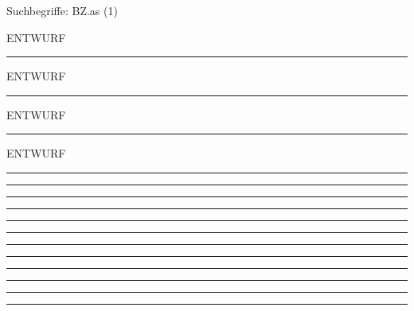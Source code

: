 \documentclass[a4paper,12pt]{report}
\begin{document}

 \scriptsize Suchbegriffe: BZ.as (1)\normalsize 
 
ENTWURF %
\hrule	 \leer

ENTWURF %
\hrule	 \leer

ENTWURF %
\hrule	 \leer

ENTWURF %
\hrule	 \leer

%
\hrule	 \leer

%
\hrule	 \leer

%
\hrule	 \leer

%
\hrule	 \leer

%
\hrule	 \leer

%
\hrule	 \leer

%
\hrule	 \leer

%
\hrule	 \leer

%
\hrule	 \leer

%
\hrule	 \leer

%
\hrule	 \leer

\end{document}
